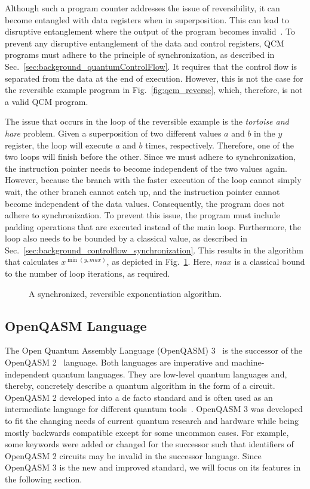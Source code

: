 Although such a program counter addresses the issue of reversibility, it can become entangled with data registers when in superposition. This can lead to disruptive entanglement where the output of the program becomes invalid~\cite{YVC24}. To prevent any disruptive entanglement of the data and control registers, QCM programs must adhere to the principle of synchronization, as described in Sec.~\ref{sec:background_quantumControlFlow}. 
It requires that the control flow is separated from the data at the end of execution. However, this is not the case for the reversible example program in Fig.~\ref{fig:qcm_reverse}, which, therefore, is not a valid QCM program.

The issue that occurs in the loop of the reversible example is the \emph{tortoise and hare} problem. Given a superposition of two different values $a$ and $b$ in the $y$ register, the loop will execute $a$ and $b$ times, respectively. Therefore, one of the two loops will finish before the other. Since we must adhere to synchronization, the instruction pointer needs to become independent of the two values again. However, because the branch with the faster execution of the loop cannot simply wait, the other branch cannot catch up, and the instruction pointer cannot become independent of the data values. Consequently, the program does not adhere to synchronization. 
To prevent this issue, the program must include padding operations that are executed instead of the main loop. Furthermore, the loop also needs to be bounded by a classical value, as described in Sec.~\ref{sec:background_controlflow_synchronization}. This results in the algorithm that calculates $x^{\min{(y, max)}}$, as depicted in Fig.~\ref{fig:qcm_sync}. Here, $max$ is a classical bound to the number of loop iterations, as required.

\begin{figure}[htp]
    \centering     
    
    \caption{A synchronized, reversible exponentiation algorithm.}
    \label{fig:qcm_sync}
\end{figure}

\subsection{OpenQASM Language}
\label{sec:background_qasm}
The Open Quantum Assembly Language (OpenQASM) 3~\cite{CJA*22} is the successor of the OpenQASM 2~\cite{CBSG17} language.
Both languages are imperative and machine-independent quantum languages. They are low-level quantum languages and, thereby, concretely describe a quantum algorithm in the form of a circuit. OpenQASM 2 developed into a de facto standard and is often used as an intermediate language for different quantum tools~\cite{CJA*22}. OpenQASM 3 was developed to fit the changing needs of current quantum research and hardware while being mostly backwards compatible except for some uncommon cases. For example, some keywords were added or changed for the successor such that identifiers of OpenQASM 2 circuits may be invalid in the successor language. Since OpenQASM 3 is the new and improved standard, we will focus on its features in the following section.


